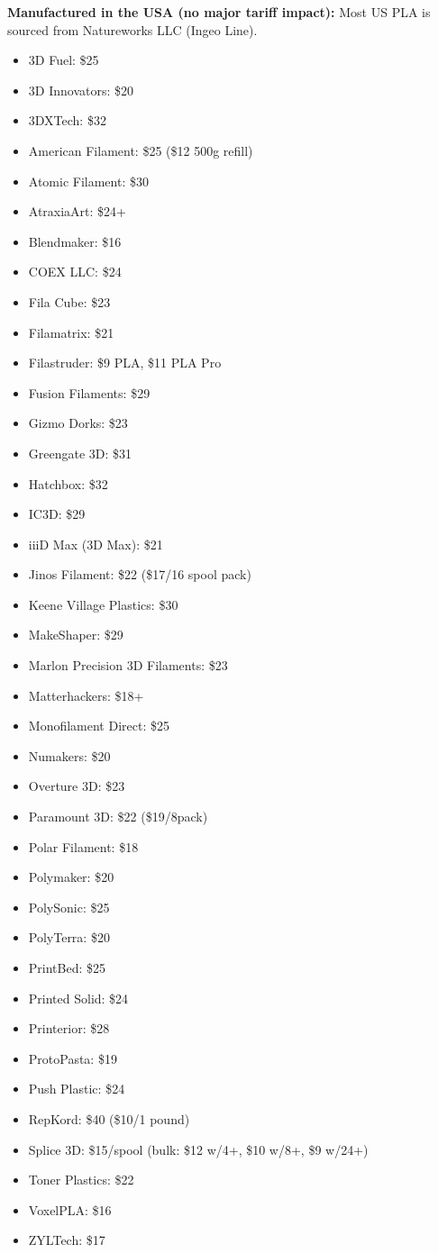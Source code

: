 \textbf{Manufactured in the USA (no major tariff impact):}
Most US PLA is sourced from Natureworks LLC (Ingeo Line).
\begin{itemize}
    \item 3D Fuel: \$25
    \item 3D Innovators: \$20
    \item 3DXTech: \$32
    \item American Filament: \$25 (\$12 500g refill)
    \item Atomic Filament: \$30
    \item AtraxiaArt: \$24+
    \item Blendmaker: \$16
    \item COEX LLC: \$24
    \item Fila Cube: \$23
    \item Filamatrix: \$21
    \item Filastruder: \$9 PLA, \$11 PLA Pro
    \item Fusion Filaments: \$29
    \item Gizmo Dorks: \$23
    \item Greengate 3D: \$31
    \item Hatchbox: \$32
    \item IC3D: \$29
    \item iiiD Max (3D Max): \$21
    \item Jinos Filament: \$22 (\$17/16 spool pack)
    \item Keene Village Plastics: \$30
    \item MakeShaper: \$29
    \item Marlon Precision 3D Filaments: \$23
    \item Matterhackers: \$18+
    \item Monofilament Direct: \$25
    \item Numakers: \$20
    \item Overture 3D: \$23
    \item Paramount 3D: \$22 (\$19/8pack)
    \item Polar Filament: \$18
    \item Polymaker: \$20
    \item PolySonic: \$25
    \item PolyTerra: \$20
    \item PrintBed: \$25
    \item Printed Solid: \$24
    \item Printerior: \$28
    \item ProtoPasta: \$19
    \item Push Plastic: \$24
    \item RepKord: \$40 (\$10/1 pound)
    \item Splice 3D: \$15/spool (bulk: \$12 w/4+, \$10 w/8+, \$9 w/24+)
    \item Toner Plastics: \$22
    \item VoxelPLA: \$16
    \item ZYLTech: \$17
\end{itemize}

